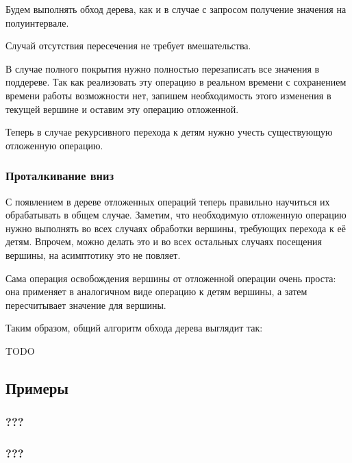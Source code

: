 \documentclass[a4paper,12pt]{article}
\begin{document}
      Будем выполнять обход дерева, как и в случае с запросом
      получение значения на полуинтервале.
      
      Случай отсутствия пересечения не требует вмешательства.

      В случае полного покрытия нужно полностью перезаписать все
      значения в поддереве. Так как реализовать эту операцию
      в реальном времени с сохранением времени работы возможности
      нет, запишем необходимость этого изменения в текущей вершине
      и оставим эту операцию отложенной.

      Теперь в случае рекурсивного перехода к детям нужно учесть
      существующую отложенную операцию.

      \subsubsection{Проталкивание вниз}

      С появлением в дереве отложенных операций теперь правильно
      научиться их обрабатывать в общем случае. Заметим, что
      необходимую отложенную операцию нужно выполнять во всех
      случаях обработки вершины, требующих перехода к её детям.
      Впрочем, можно делать это и во всех остальных случаях
      посещения вершины, на асимптотику это не повляет.

      Сама операция освобождения вершины от отложенной операции
      очень проста: она применяет в аналогичном виде операцию
      к детям вершины, а затем пересчитывает значение для вершины.

      Таким образом, общий алгоритм обхода дерева выглядит так:

      TODO

    \subsection{Примеры}
      \subsubsection{???}
      \subsubsection{???}
\end{document}
